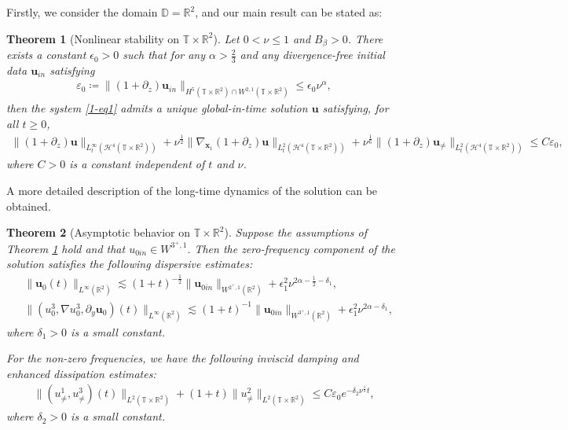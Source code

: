 \documentclass[11pt,reqno]{article}
\newtheorem{theo}{Theorem}[section]
\numberwithin{equation}{section}
\newcommand\R{{\mathbb R}}
\newcommand\T{{\mathbb T}}
\newcommand\DD{{\mathbb D}}
\newcommand\HH{{\mathcal H}}
\newcommand\x{\bm{x}}
\newcommand\uu{\bm{u}}
\newcommand \tri {\coloneqq}
\let\pa=\partial
\let\al=\alpha
\let\var=\varepsilon
\let\f=\frac
\let\ep=\epsilon
\begin{document}
Firstly, we consider the domain $\DD=\R^2$, and our main result can be stated as:
\begin{theo}[Nonlinear stability on $\T\times\R^2$]
	\label{theo1}
	Let $0<\nu\leq 1$ and $B_{\beta}>0$.
	There exists a constant $\ep_0>0$ %
	such that for any $\alpha>\f23$ and any divergence-free initial data $\uu_{in}$ satisfying
	\begin{align}\label{initial data-assume}
		\var_0\tri \|(1+\pa_z)\uu_{in}\|_{H^5(\T\times\R^2)\cap W^{2,1}(\T\times\R^2)}
		\leq \ep_0 \nu^{\alpha},
	\end{align}
	then the system \eqref{1-eq1} admits a unique global-in-time solution $\uu$ satisfying, for all $t\geq0$, 
	\begin{align*}
		\|(1+\pa_z)\uu\|_{L_t^{\infty}(\HH^4(\T\times\R^2)) }
		+	\nu^{\f12}	\|\nabla_{\x_1}(1+\pa_z)\uu\|_{L_t^2(\HH^4(\T\times\R^2))}
		+\nu^{\f16}	 \|(1+\pa_z)\uu_{\not=}\|_{L^2_t(\HH^4(\T\times\R^2))}  
		\leq C\var_0,
	\end{align*}
	where $C>0$ is a constant independent of $t$ and $\nu$.
\end{theo}

A more detailed description of the long-time dynamics of the solution can be obtained.
\begin{theo}[Asymptotic behavior on $\T\times\R^2$]
\label{theo2}
Suppose the assumptions of Theorem \ref{theo1} hold
 and that $u_{0in}\in W^{3^{+},1}.$ Then the zero-frequency component of the solution satisfies the following dispersive estimates:
	\begin{align}
    \label{Asy-u0-1}		&\|\uu_0(t)\|_{L^\infty(\R^2)}\lesssim (1+t)^{-\f12} \|\uu_{0in}\|_{W^{2^+,1}(\R^2)}+\ep_1^2\nu^{2\al-\f12-\delta_1},
        \\
    \label{Asy-u0-2}
        &\|( u_0^3,\nabla u_0^3,\pa_y\uu_0)(t)\|_{L^\infty(\R^2)}\lesssim (1+t)^{-1} \|\uu_{0in}\|_{W^{3^+,1}(\R^2)}+\ep_1^2\nu^{2\al-\delta_1},
	\end{align}
	where $\delta_1>0$ is a small constant.
	
	For the non-zero frequencies, we have the following inviscid damping and enhanced dissipation estimates:
	\begin{align}\label{Asy-unot}
		\|(u_{\not=}^1,u_{\not=}^3)(t)\|_{L^2(\T\times\R^2)}
		+(1+t)\| u_{\not=}^2\|_{L^2(\T\times\R^2)}
		\leq C \var_0 e^{-\delta_2 \nu^{\f13}t},
	\end{align}
	where $\delta_2>0$ is a small constant.
\end{theo}
\end{document}
